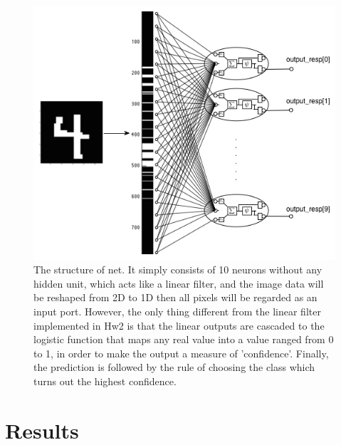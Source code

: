 \documentclass[12pt]{article}
\begin{document}
\begin{figure}
	\hspace*{-2em}
	\includegraphics[scale=.65]{../res/netStruct.png}
	\caption{The structure of net. It simply consists of 10 neurons without any hidden unit, which acts like a linear filter, and the image data will be reshaped from 2D to 1D then all pixels will be regarded as an input port. However, the only thing different from the linear filter implemented in Hw2 is that the linear outputs are cascaded to the logistic function that maps any real value into a value ranged from 0 to 1, in order to make the output a measure of 'confidence'. Finally, the prediction is followed by the rule of choosing the class which turns out the highest confidence.}
\end{figure}

\newpage

\section*{Results}
\vspace{-20pt}
\noindent\makebox[\linewidth]{\rule{\textwidth}{0.4pt}}
\end{document}
